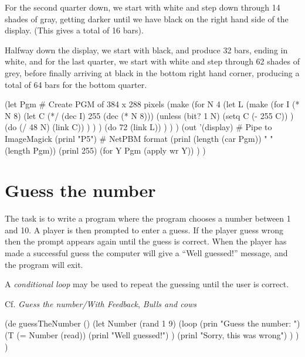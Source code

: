 For the second quarter down, we start with white and step down through
14 shades of gray, getting darker until we have black on the right hand
side of the display. (This gives a total of 16 bars).

Halfway down the display, we start with black, and produce 32 bars,
ending in white, and for the last quarter, we start with white and step
through 62 shades of grey, before finally arriving at black in the
bottom right hand corner, producing a total of 64 bars for the bottom
quarter.


\begin{wideverbatim}

(let Pgm  # Create PGM of 384 x 288 pixels
   (make
      (for N 4
         (let L
            (make
               (for I (* N 8)
                  (let C (*/ (dec I) 255 (dec (* N 8)))
                     (unless (bit? 1 N)
                        (setq C (- 255 C)) )
                     (do (/ 48 N) (link C)) ) ) )
            (do 72 (link L)) ) ) )
   (out '(display)  # Pipe to ImageMagick
      (prinl "P5")  # NetPBM format
      (prinl (length (car Pgm)) " " (length Pgm))
      (prinl 255)
      (for Y Pgm (apply wr Y)) ) )

\end{wideverbatim}


\pagebreak{}
\section*{Guess the number}

The task is to write a program where the program chooses a number
between 1 and 10. A player is then prompted to enter a guess. If the
player guess wrong then the prompt appears again until the guess is
correct. When the player has made a successful guess the computer will
give a ``Well guessed!'' message, and the program will exit.

A \emph{conditional loop} may be used to repeat the guessing until the
user is correct.

Cf. \emph{Guess the number/With Feedback}, \emph{Bulls and cows}


\begin{wideverbatim}

(de guessTheNumber ()
   (let Number (rand 1 9)
      (loop
         (prin "Guess the number: ")
         (T (= Number (read))
            (prinl "Well guessed!") )
         (prinl "Sorry, this was wrong") ) ) )

\end{wideverbatim}

